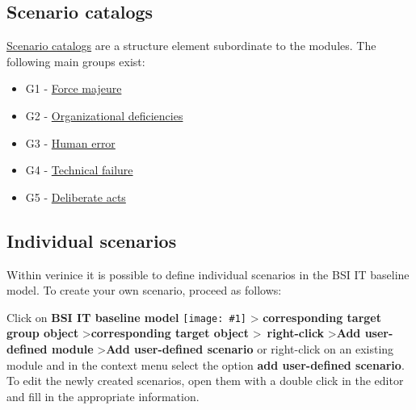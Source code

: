 \documentclass[a4paper,10pt]{book}
\newcommand{\icon}[1]{\texttt{[image: \#1]}}
\begin{document}
\subsection{Scenario catalogs}
\href{https://www.bsi.bund.de/cln_156/DE/Themen/weitereThemen/ITGrundschutzKataloge/Inhalt/Gefaehrdungskataloge/gefaehrdungskataloge_node.html}{Scenario catalogs} are a structure element subordinate to the modules.
The following main groups exist:
\begin{itemize}
\item G1 - \href{https://www.bsi.bund.de/cln_156/DE/Themen/weitereThemen/ITGrundschutzKataloge/Inhalt/Gefaehrdungskataloge/G1HoehereGewalt/g1hoeheregewalt_node.html}{Force majeure}
\item G2 - \href{https://www.bsi.bund.de/cln_156/DE/Themen/weitereThemen/ITGrundschutzKataloge/Inhalt/Gefaehrdungskataloge/G2OrganisatorischeMaengel/g2organisatorischemaengel_node.html}{Organizational deficiencies}
\item G3 - \href{https://www.bsi.bund.de/cln_156/DE/Themen/weitereThemen/ITGrundschutzKataloge/Inhalt/Gefaehrdungskataloge/G3MenschlicheFehlhandlung/g3menschlichefehlhandlung_node.html}{Human error}
\item G4 - \href{https://www.bsi.bund.de/cln_156/DE/Themen/weitereThemen/ITGrundschutzKataloge/Inhalt/Gefaehrdungskataloge/G4TechnischesVersagen/g4technischesversagen_node.html}{Technical failure}
\item G5 - \href{https://www.bsi.bund.de/cln_156/DE/Themen/weitereThemen/ITGrundschutzKataloge/Inhalt/Gefaehrdungskataloge/G5VorsaetzlicheHandlungen/g5vorsaetzlichehandlungen_node.html}{Deliberate acts}
\end{itemize}

\subsection{Individual scenarios}\label{sec_individual_scenarios}
Within verinice it is possible to define individual scenarios in the BSI
IT baseline model. To create your own scenario, proceed as follows:

Click on \textbf{BSI IT baseline model} \icon{Icon/GS_Modell.png} \textgreater
\textbf{corresponding target group object} \textgreater \textbf{corresponding target object} \textgreater\ \textbf{right-click} \textgreater \textbf{Add user-defined module} \textgreater \textbf{Add user-defined scenario} or right-click on an existing module and in the context menu select the option \textbf{add user-defined scenario}.
To edit the newly created scenarios, open them with a double click in the editor and fill in the appropriate information.
\end{document}
